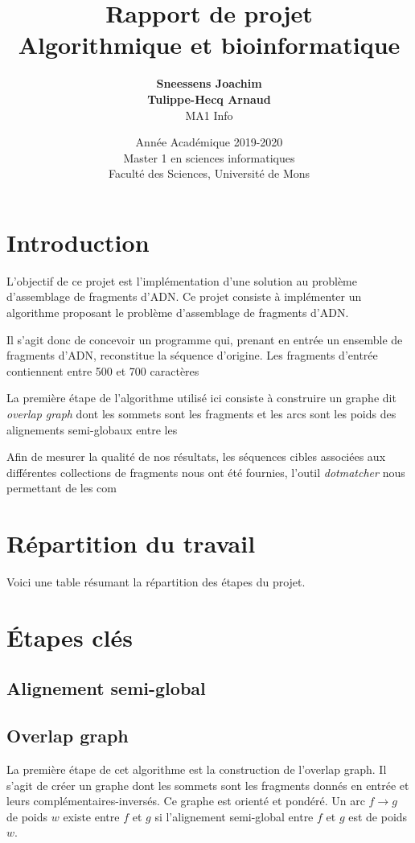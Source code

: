\documentclass{article}
\title{
{\Huge \textbf{Rapport de projet}\\
Algorithmique et bioinformatique}}
\author{\textbf{Sneessens Joachim}\\\textbf{Tulippe-Hecq Arnaud}\\MA1 Info}
\date{Année Académique 2019-2020\\
Master 1 en sciences informatiques\\
\vspace{1cm}
Faculté des Sciences, Université de Mons}
\begin{document}
\maketitle

\newpage

\section{Introduction}

L'objectif de ce projet est l'implémentation d'une solution au problème d'assemblage de fragments d'ADN. 
Ce projet consiste à implémenter un algorithme proposant le problème d'assemblage de fragments d'ADN.

 Il s'agit donc de concevoir un programme qui, prenant en entrée un ensemble de fragments d'ADN, reconstitue la séquence d'origine. Les fragments d'entrée contiennent entre 500 et 700 caractères



La première étape de l'algorithme utilisé ici consiste à construire un graphe dit \textit{overlap graph} dont les sommets sont les fragments et les arcs sont les poids des alignements semi-globaux entre les 


Afin de mesurer la qualité de nos résultats, les séquences cibles associées aux différentes collections de fragments nous ont été fournies, l'outil \textit{dotmatcher} nous permettant de les com

\section{Répartition du travail}

Voici une table résumant la répartition des étapes du projet.




\section{\'Etapes clés}

\subsection{Alignement semi-global}

\subsection{Overlap graph}

La première étape de cet algorithme est la construction de l'overlap graph. Il s'agit de créer un graphe dont les sommets sont les fragments donnés en entrée et leurs complémentaires-inversés. Ce graphe est orienté et pondéré. Un arc $f\to g$ de poids $w$ existe entre $f$ et $g$ si l'alignement semi-global entre $f$ et $g$ est de poids $w$.
\end{document}
